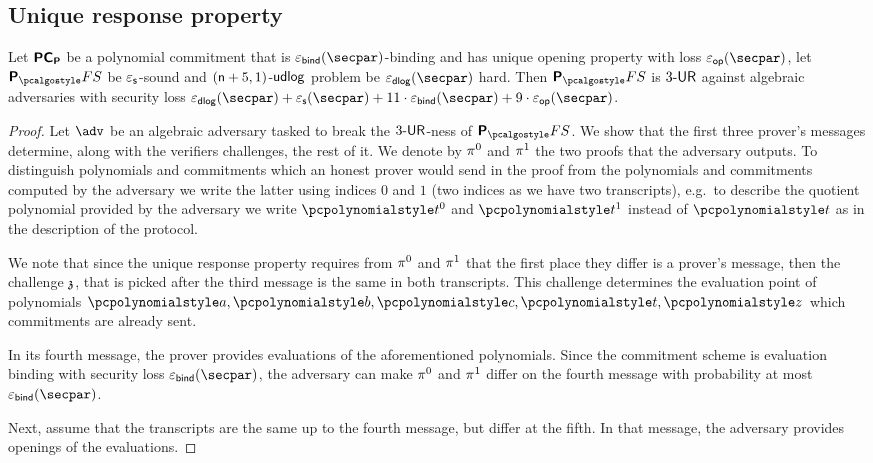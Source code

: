 \subsection{Unique response property}
\begin{lemma}
	\label{lem:plonkprot_ur}
	Let $\bm{\mathsf{PC}}_{\bm{\mathsf{P}}}$ be a polynomial commitment that is $\epsbind(\secpar)$-binding and has unique opening
	property with loss $\epsop(\secpar)$, let $\plonkprotfs$ be $\varepsilon_{\mathsf{s}}$-sound and
		$(\mathsf{n} + 5, 1)$-$\mathsf{udlog}$ problem be $\epsdlog (\secpar)$ hard. Then $\plonkprotfs$ is ${3\text{-}\mathsf{UR}}$ against algebraic adversaries with security loss $\epsdlog(\secpar) + \epss (\secpar) + 11 \cdot \epsbind (\secpar) + 9 \cdot \epsop(\secpar)$.
\end{lemma}
\begin{proof}
  Let $\adv$ be an algebraic adversary tasked to break the ${3\text{-}\mathsf{UR}}$-ness of
	$\plonkprotfs$. We show that the first three prover's messages determine, along with 	the verifiers challenges, the rest of it. We denote by $\pi^0$ and $\pi^1$ the two proofs that the adversary outputs. To distinguish polynomials and commitments which an honest prover would send in the proof from the polynomials and commitments computed by the adversary we write the latter using indices $0$ and $1$ (two indices as we have two transcripts), e.g.~to describe the quotient polynomial provided by the adversary we write $\p{t}^0$ and $\p{t}^1$ instead of $\p{t}$ as in the description of the protocol.

  We note that since the unique response property requires from $\pi^{0}$ and $\pi^{1}$ that the first place they differ is a prover's message, then the challenge $\mathfrak{z}$, that is picked after the third message is the same in both transcripts. This challenge determines the evaluation point of polynomials $\p{a}, \p{b}, \p{c}, \p{t}, \p{z}$ which commitments are already sent.

  In its fourth message, the prover provides evaluations of the aforementioned polynomials. Since the commitment scheme is evaluation binding with security loss $\epsbinding (\secpar)$, the adversary can make $\pi^{0}$ and $\pi^{1}$ differ on the fourth message with probability at most $\epsbinding (\secpar)$. 

  Next, assume that the transcripts are the same up to the fourth message, but differ at the fifth. In that message, the adversary provides openings of the evaluations. 

  \end{proof}

